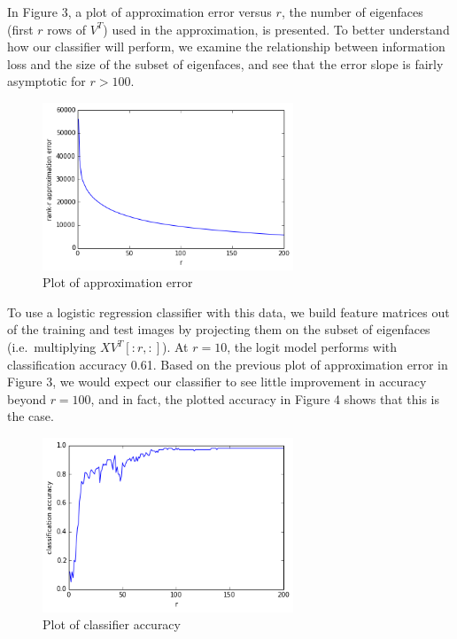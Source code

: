 \documentclass[12pt]{report}
\begin{document}
In Figure 3, a plot of approximation error versus $r$, the number of eigenfaces (first $r$
rows of $V^T$) used in the approximation, is presented. To better understand how our classifier
will perform, we examine the relationship between information loss and the size of the subset of
eigenfaces, and see that the error slope is fairly asymptotic for $r > 100$.

\begin{figure}
\centering
  \includegraphics[width=75mm]{figures/error.png}
\caption{Plot of approximation error}
\end{figure}

To use a logistic regression classifier with this data, we build feature matrices out of the
training and test images by projecting them on the subset of eigenfaces (i.e.\ multiplying
$XV^T[:r,:]$). At $r = 10$, the logit model performs with classification accuracy 0.61. Based
on the previous plot of approximation error in Figure 3, we would expect our classifier
to see little improvement in accuracy beyond $r = 100$, and in fact, the plotted accuracy
in Figure 4 shows that this is the case.

\begin{figure}
\centering
  \includegraphics[width=75mm]{figures/accuracy.png}
\caption{Plot of classifier accuracy}
\end{figure}
\end{document}
